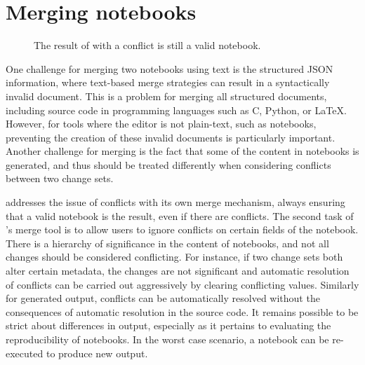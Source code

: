 \documentclass{deliverablereport}
\newcommand{\nbdime}{\software{nbdime}}
\newcommand{\nbmerge}{\software{nbmerge}}
\begin{document}

\section{Merging notebooks} %
\label{sec:merging_notebooks}

\begin{figure}
    \center
    \caption{The result of \nbmerge with a conflict is still a valid notebook.}
    \label{fig:nbmerge}
\end{figure}

One challenge for merging two notebooks using text is the structured JSON information, where
text-based merge strategies can result in a syntactically invalid document. This is a problem for
merging all structured documents, including source code in programming languages such as C, Python,
or \LaTeX. However, for tools where the editor is not plain-text, such as notebooks, preventing the
creation of these invalid documents is particularly important. Another challenge for merging is the
fact that some of the content in notebooks is generated, and thus should be treated differently
when considering conflicts between two change sets.

\nbdime addresses the issue of conflicts with its own merge mechanism, always ensuring that a valid notebook is the result, even if there are conflicts.
The second task of \nbdime's merge tool is to allow users to ignore conflicts on certain fields of the notebook.
There is a hierarchy of significance in the content of notebooks,
and not all changes should be considered conflicting.
For instance, if two change sets both alter certain metadata,
the changes are not significant and automatic resolution of conflicts
can be carried out aggressively by clearing conflicting values.
Similarly for generated output, conflicts can be automatically resolved without the consequences of automatic resolution in the source code.
It remains possible to be strict about differences in output,
especially as it pertains to evaluating the reproducibility of notebooks.
In the worst case scenario, a notebook can be re-executed to produce new output.
\end{document}

